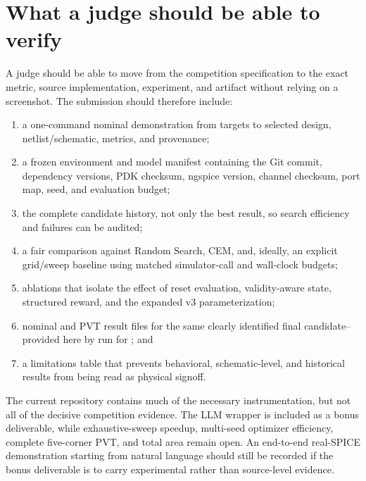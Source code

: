 \section{What a judge should be able to verify}

A judge should be able to move from the competition specification to the exact
metric, source implementation, experiment, and artifact without relying on a
screenshot. The submission should therefore include:

\begin{enumerate}
  \item a one-command nominal demonstration from targets to selected design,
        netlist/schematic, metrics, and provenance;
  \item a frozen environment and model manifest containing the Git commit,
        dependency versions, PDK checksum, ngspice version, channel checksum,
        port map, seed, and evaluation budget;
  \item the complete candidate history, not only the best result, so search
        efficiency and failures can be audited;
  \item a fair comparison against Random Search, CEM, and, ideally, an explicit
        grid/sweep baseline using matched simulator-call and wall-clock budgets;
  \item ablations that isolate the effect of reset evaluation, validity-aware
        state, structured reward, and the expanded v3 parameterization;
  \item nominal and PVT result files for the same clearly identified final
        candidate--provided here by run  for
        ; and
  \item a limitations table that prevents behavioral, schematic-level, and
        historical results from being read as physical signoff.
\end{enumerate}

The current repository contains much of the necessary instrumentation, but not
all of the decisive competition evidence. The LLM wrapper is included as a bonus
deliverable, while exhaustive-sweep speedup, multi-seed optimizer efficiency,
complete five-corner PVT, and total area remain open. An end-to-end real-SPICE
demonstration starting from natural language should still be recorded if the
bonus deliverable is to carry experimental rather than source-level evidence.
